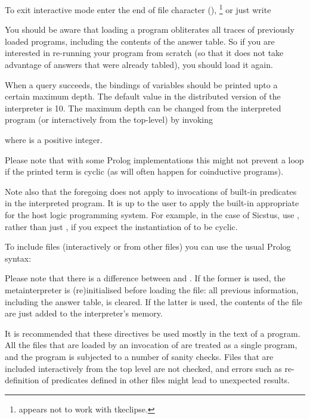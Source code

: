 To exit interactive mode enter the end of file character
(),%
\footnote{
   appears not to work with tkeclipse.}
or just write\\
\ind{}

You should be aware that loading a program obliterates all traces of
previously loaded programs, including the contents of the answer table.  So
if you are interested in re-running your program from scratch (so that it
does not take advantage of answers that were already tabled), you should load
it again.


When a query succeeds, the bindings of variables should be printed upto a
certain maximum depth.  The default value in the distributed version of the
interpreter is 10.  The maximum depth can be changed from the interpreted
program (or interactively from the top-level) by invoking\\
\ind{}\prog{~)}

where  is a positive integer.

Please note that with some Prolog implementations this might not prevent a
loop if the printed term is cyclic (as will often happen for coinductive
programs).

Note also that the foregoing does not apply to invocations of built-in
predicates in the interpreted program.  It is up to the user to apply the
built-in appropriate for the host logic programming system.  For example, in
the case of Sicstus, use , rather
than just , if you expect the instantiation of
 to be cyclic.




To include files (interactively or from other files) you can use the usual
Prolog syntax:\\
\ind\prog{:- [~}\prog{,~}\prog{,~}\prog{~].}

Please note that there is a difference between
\prog{~)} and \prog{:-~[~}\prog{~].}.  If
the former is used, the metainterpreter is (re)initialised before loading the
file: all previous information, including the answer table, is cleared.  If
the latter is used, the contents of the file are just added to the
interpreter's memory.

It is recommended that these directives be used mostly in the text of a
program.  All the files that are loaded by an invocation of  are
treated as a single program, and the program is subjected to a number of
sanity checks.  Files that are included interactively from the top level are
not checked, and errors such as re-definition of predicates defined in other
files might lead to unexpected results.

